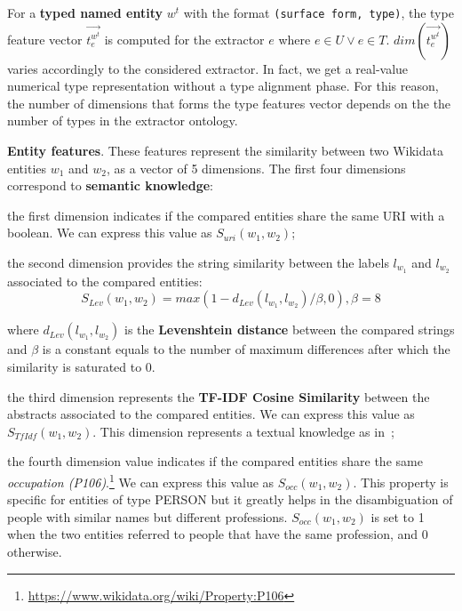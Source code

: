 \documentclass{llncs}
\begin{document}
For a \textbf{typed named entity} $w^t$ with the format \texttt{(surface form, type)}, the type feature vector $\vec{t^{w^{t}}_{e}}$ is computed for the extractor $e$ where $e \in U \lor e \in T$. $dim(\vec{t^{w^{t}}_{e}})$ varies accordingly to the considered extractor. In fact, we get a real-value numerical type representation without a type alignment phase. For this reason, the number of dimensions that forms the type features vector depends on the the number of types in the extractor ontology.

\textbf{Entity features}. These features represent the similarity between two Wikidata entities $w_1$ and $w_2$, as a vector of 5 dimensions. The first four dimensions correspond to \textbf{semantic knowledge}:
\begin{enumerate}
\begin{item}
the first dimension indicates if the compared entities share the same URI with a boolean. We can express this value as $S_{uri}(w_1,w_2)$; \end{item}
\begin{item}
the second dimension provides the string similarity between the labels $l_{w_1}$ and $l_{w_2}$ associated to the compared entities: 
$$S_{Lev}(w_1,w_2) = max(1-d_{Lev}(l_{w_1},l_{w_2})/\beta,0), \beta = 8$$

where $d_{Lev}(l_{w_1},l_{w_2})$ is the \textbf{Levenshtein distance} between the compared strings and $\beta$ is a constant equals to the number of maximum differences after which the similarity is saturated to 0.
\end{item}
\begin{item}
the third dimension represents the \textbf{TF-IDF Cosine Similarity} between the abstracts associated to the compared entities. We can express this value as $S_{TfIdf}(w_1,w_2)$. This dimension represents a textual knowledge as in~\cite{CollaborativeKnowledgeBaseEmbeddingforRecommenderSystems};
\end{item}
\begin{item}
the fourth dimension value indicates if the compared entities share the same \textit{occupation (P106)}.\footnote{\url{https://www.wikidata.org/wiki/Property:P106}} We can express this value as $S_{occ}(w_1,w_2)$. This property is specific for entities of type PERSON but it greatly helps in the disambiguation of people with similar names but different professions. $S_{occ}(w_1,w_2)$ is set to 1 when the two entities referred to people that have the same profession, and 0 otherwise.
\end{item}
\end{enumerate}
\end{document}
